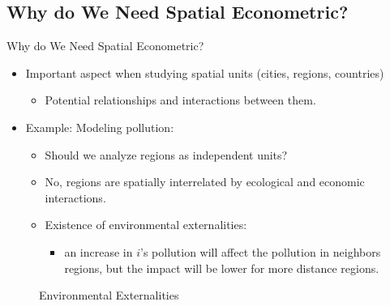 \documentclass[english,10pt]{beamer}\usepackage[]{graphicx}\usepackage[]{xcolor}
\begin{document}
\subsection{Why do We Need Spatial Econometric?}

\begin{frame}{Why do We Need Spatial Econometric?}
  \begin{itemize}
    \item Important aspect when studying spatial units (cities, regions, countries)
      \begin{itemize}
        \item Potential relationships and interactions between them. 
      \end{itemize}
    \item Example: Modeling pollution:
      \begin{itemize}
        \item Should we analyze regions as independent units?
        \item No, regions are spatially interrelated by ecological and economic interactions.
        \item Existence of environmental externalities:
          \begin{itemize}
            \item an increase in $i$'s pollution will affect the pollution in neighbors regions, but the impact will be lower for more distance regions. 
          \end{itemize}
      \end{itemize}
  \end{itemize}
\end{frame}


\begin{frame}
\begin{figure}[h]
\caption{Environmental Externalities}
\label{fig:example_poll}
\centering
{}
\end{figure}
\end{frame}
\end{document}
